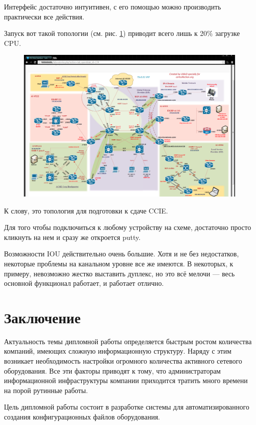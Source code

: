 \documentclass[a4paper,14pt]{extreport}
\begin{document}
	Интерфейс достаточно интуитивен, с его помощью можно производить практически все действия.
	
	Запуск вот такой топологии (см. рис. \ref{fig:topologyCCIE}) приводит всего лишь к 20\% загрузке CPU.	
	
	\begin{figure}[h!]
	\centering
	\includegraphics[width=0.7\linewidth]{pic/topologyCCIE}
	\caption{}
	\label{fig:topologyCCIE}
	\end{figure}
		
	К слову, это топология для подготовки к сдаче CCIE.
	
	Для того чтобы подключиться к любому устройству на схеме, достаточно просто кликнуть на нем и сразу же откроется putty.
	
	
	
	Возможности IOU действительно очень большие.
	Хотя и не без недостатков, некоторые проблемы на канальном уровне все же имеются.
	В некоторых, к примеру, невозможно жестко выставить дуплекс, но это всё мелочи — весь основной функционал работает, и работает отлично.
	
	\chapter*{Заключение}
	
	Актуальность темы дипломной работы определяется быстрым ростом количества компаний, имеющих сложную информационную структуру. Наряду с этим возникает необходимость настройки огромного количества активного сетевого оборудования.	
	Все эти факторы приводят к тому, что администраторам информационной инфраструктуры компании приходится тратить много времени на порой рутинные работы.
	
	Цель дипломной работы состоит в разработке системы для автоматизированного создания конфигурационных файлов оборудования.
	
\end{document}
